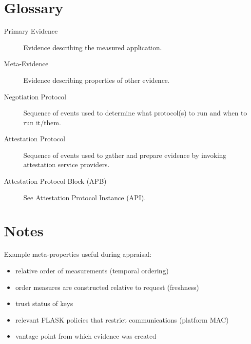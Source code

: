 \documentclass[10pt]{article}
\newcommand{\squash}{\parskip=0pt\itemsep=0pt}
\begin{document}
\appendix

\section*{Glossary}

\begin{description}
\item[Primary Evidence] Evidence describing the measured application.
\item[Meta-Evidence] Evidence describing properties of other evidence.
\item[Negotiation Protocol] Sequence of events used to determine what
  protocol(s) to run and when to run it/them.
\item[Attestation Protocol] Sequence of events used to gather and
  prepare evidence by invoking attestation service providers.
\item[Attestation Protocol Block (APB)] See Attestation Protocol
  Instance (API).
\end{description}

\nocite{Coker::Principles-of-R,Loscocco:98:The-Inevitabili}

\section*{Notes}

Example meta-properties useful during appraisal:

\begin{itemize}
  \squash
\item relative order of measurements (temporal ordering)
\item order measures are constructed relative to request (freshness)
\item trust status of keys
\item relevant FLASK policies that restrict communications (platform MAC)
\item vantage point from which evidence was created
\end{itemize}


\end{document}
